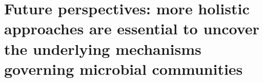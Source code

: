 



\section{Future perspectives: more holistic approaches are essential to uncover the underlying mechanisms governing microbial communities}
\label{chap:fut-work}

